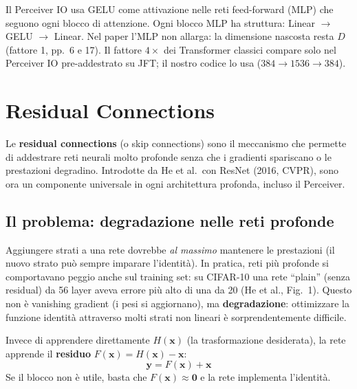 \documentclass[
  11pt,
]{article}
\begin{document}
\begin{notabox}[title={\textbf{Collegamento al Perceiver}}]
Il Perceiver IO usa GELU come attivazione nelle reti feed-forward (MLP) che seguono ogni blocco di attenzione. Ogni blocco MLP ha struttura: Linear $\to$ GELU $\to$ Linear. Nel paper l'MLP non allarga: la dimensione nascosta resta $D$ (fattore 1, pp.~6 e 17). Il fattore $4\times$ dei Transformer classici compare solo nel Perceiver IO pre-addestrato su JFT; il nostro codice lo usa ($384 \to 1536 \to 384$).
\end{notabox}

\section{Residual Connections}
\label{app:residual}

Le \textbf{residual connections} (o skip connections) sono il meccanismo che permette di addestrare reti neurali molto profonde senza che i gradienti spariscano o le prestazioni degradino. Introdotte da He et al.\ con ResNet (2016, CVPR), sono ora un componente universale in ogni architettura profonda, incluso il Perceiver.

\subsection{Il problema: degradazione nelle reti profonde}

Aggiungere strati a una rete dovrebbe \emph{al massimo} mantenere le prestazioni (il nuovo strato può sempre imparare l'identità). In pratica, reti più profonde si comportavano peggio anche sul training set: su CIFAR-10 una rete ``plain'' (senza residual) da 56 layer aveva errore più alto di una da 20 (He et al., Fig.~1). Questo non è vanishing gradient (i pesi si aggiornano), ma \textbf{degradazione}: ottimizzare la funzione identità attraverso molti strati non lineari è sorprendentemente difficile.

\begin{formulabox}[title={\textbf{Residual Connection}}]
Invece di apprendere direttamente $H(\mathbf{x})$ (la trasformazione desiderata), la rete apprende il \textbf{residuo} $F(\mathbf{x}) = H(\mathbf{x}) - \mathbf{x}$:
\[
\mathbf{y} = F(\mathbf{x}) + \mathbf{x}
\]
Se il blocco non è utile, basta che $F(\mathbf{x}) \approx \mathbf{0}$ e la rete implementa l'identità.
\end{formulabox}
\end{document}
